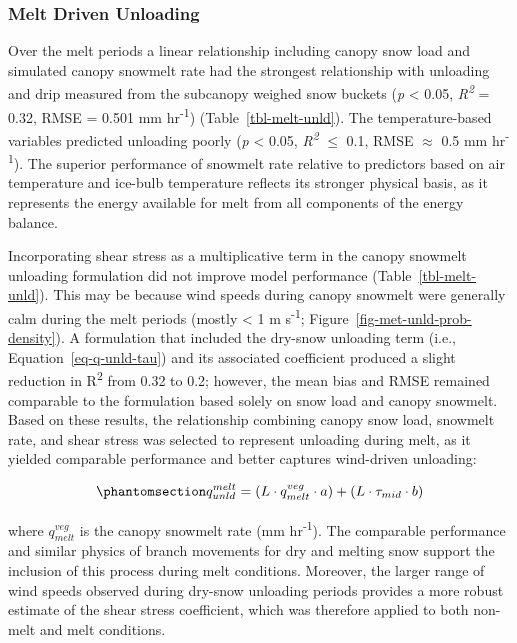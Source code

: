 \documentclass[
  letterpaper,
]{tex/uofsthesis-cs}
\begin{document}
\subsubsection{Melt Driven Unloading}\label{sec-melt-unld}

Over the melt periods a linear relationship including canopy snow load
and simulated canopy snowmelt rate had the strongest relationship with
unloading and drip measured from the subcanopy weighed snow buckets
(\emph{p} \textless{} 0.05, \emph{R\textsuperscript{2}} = 0.32, RMSE =
0.501 mm hr\textsuperscript{-1}) (Table~\ref{tbl-melt-unld}). The
temperature-based variables predicted unloading poorly (\emph{p}
\textless{} 0.05, \emph{R\textsuperscript{2}} \(\le\) 0.1, RMSE
\(\approx\) 0.5 mm hr\textsuperscript{-1}). The superior performance of
snowmelt rate relative to predictors based on air temperature and
ice-bulb temperature reflects its stronger physical basis, as it
represents the energy available for melt from all components of the
energy balance.

Incorporating shear stress as a multiplicative term in the canopy
snowmelt unloading formulation did not improve model performance
(Table~\ref{tbl-melt-unld}). This may be because wind speeds during
canopy snowmelt were generally calm during the melt periods (mostly
\textless{} 1 m s\textsuperscript{-1};
Figure~\ref{fig-met-unld-prob-density}). A formulation that included the
dry-snow unloading term (i.e., Equation~\ref{eq-q-unld-tau}) and its
associated coefficient produced a slight reduction in
R\textsuperscript{2} from 0.32 to 0.2; however, the mean bias and RMSE
remained comparable to the formulation based solely on snow load and
canopy snowmelt. Based on these results, the relationship combining
canopy snow load, snowmelt rate, and shear stress was selected to
represent unloading during melt, as it yielded comparable performance
and better captures wind-driven unloading:

\begin{equation}\phantomsection\label{eq-q-unld-melt}{
q_{unld}^{melt} = (L \cdot q_{melt}^{veg} \cdot a) + (L \cdot \tau_{mid} \cdot b)
}\end{equation}

where \(q_{melt}^{veg}\) is the canopy snowmelt rate (mm
hr\textsuperscript{-1}). The comparable performance and similar physics
of branch movements for dry and melting snow support the inclusion of
this process during melt conditions. Moreover, the larger range of wind
speeds observed during dry-snow unloading periods provides a more robust
estimate of the shear stress coefficient, which was therefore applied to
both non-melt and melt conditions.
\end{document}
